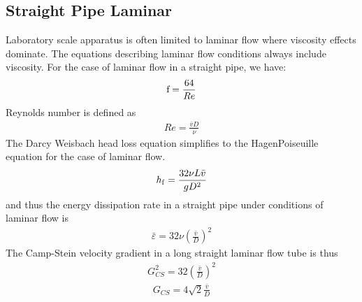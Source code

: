 \documentclass[letterpaper,10pt,english]{sphinxmanual}
\begin{document}
\subsection{Straight Pipe Laminar}
\label{\detokenize{Rapid_Mix/RM_Derivations:straight-pipe-laminar}}\label{\detokenize{Rapid_Mix/RM_Derivations:heading-straight-pipe-laminar}}
Laboratory scale apparatus is often limited to laminar flow where viscosity effects dominate. The equations describing laminar flow conditions always include viscosity. For the case of laminar flow in a straight pipe, we have:
\begin{equation}\label{equation:Rapid_Mix/RM_Derivations:Rapid_Mix/RM_Derivations:55}
\begin{split}{\rm f} = \frac{64}{Re}\end{split}
\end{equation}
Reynolds number is defined as
\begin{equation}\label{equation:Rapid_Mix/RM_Derivations:Rapid_Mix/RM_Derivations:56}
\begin{split}Re= \frac{\bar vD}{\nu}\end{split}
\end{equation}
The Darcy Weisbach head loss equation simplifies to the Hagen\textendash{}Poiseuille equation for the case of laminar flow.
\begin{equation}\label{equation:Rapid_Mix/RM_Derivations:Rapid_Mix/RM_Derivations:57}
\begin{split}h_{{\rm f}} = \frac{32\nu L\bar v}{gD^2}\end{split}
\end{equation}
and thus the energy dissipation rate in a straight pipe under conditions of laminar flow is
\begin{equation}\label{equation:Rapid_Mix/RM_Derivations:Rapid_Mix/RM_Derivations:58}
\begin{split}\bar\varepsilon =32\nu \left( \frac{\bar v}{D} \right)^2\end{split}
\end{equation}
The Camp-Stein velocity gradient in a long straight laminar flow tube is thus
\begin{equation}\label{equation:Rapid_Mix/RM_Derivations:Rapid_Mix/RM_Derivations:59}
\begin{split}G_{CS}^2 =32 \left( \frac{\bar v}{D} \right)^2\end{split}
\end{equation}\begin{equation}\label{equation:Rapid_Mix/RM_Derivations:Rapid_Mix/RM_Derivations:60}
\begin{split}G_{CS} =4\sqrt2 \frac{\bar v}{D}\end{split}
\end{equation}
\end{document}
